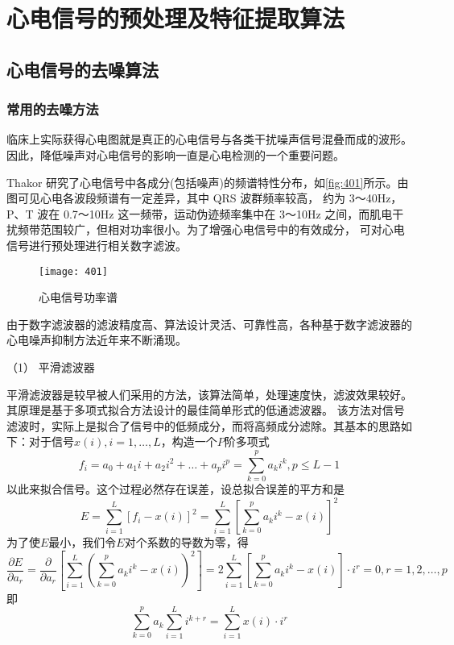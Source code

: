 \chapter{心电信号的预处理及特征提取算法}
\section{心电信号的去噪算法}
\subsection{常用的去噪方法}
临床上实际获得心电图就是真正的心电信号与各类干扰噪声信号混叠而成的波形。因此，降低噪声对心电信号的影响一直是心电检测的一个重要问题\cite{11}。 

Thakor 研究了心电信号中各成分(包括噪声)的频谱特性分布\cite{12}，如\autoref{fig:401}所示。由图可见心电各波段频谱有一定差异，其中 QRS 波群频率较高，
约为 3～40Hz，P、T 波在 0.7～10Hz 这一频带，运动伪迹频率集中在 3～10Hz 之间，而肌电干扰频带范围较广，但相对功率很小。为了增强心电信号中的有效成分，
可对心电信号进行预处理进行相关数字滤波\cite{13}。  
\begin{figure}[htbp]
    \centering
    \texttt{[image: 401]}
    \caption{\label{fig:401}心电信号功率谱}
\end{figure}

由于数字滤波器的滤波精度高、算法设计灵活、可靠性高，各种基于数字滤波器的心电噪声抑制方法近年来不断涌现。 

（1） 平滑滤波器 

平滑滤波器是较早被人们采用的方法，该算法简单，处理速度快，滤波效果较好\cite{14}。其原理是基于多项式拟合方法设计的最佳简单形式的低通滤波器\cite{15}。
该方法对信号滤波时，实际上是拟合了信号中的低频成分，而将高频成分滤除。其基本的思路如下：对于信号$x(i),i=1,\dots,L$，构造一个$P$阶多项式
\begin{equation}
    \label{equ:401}
    f_i=a_0+a_1i+a_2i^{2}+\dots+a_pi^{p}=\sum_{k=0}^{p}a_ki^k,  p\le L-1
\end{equation}
以此来拟合信号。这个过程必然存在误差，设总拟合误差的平方和是 
\begin{equation}
    \label{equ:402}
    E=\sum_{i=1}^L[f_i-x(i)]^2=\sum_{i=1}^L[\sum_{k=0}^pa_ki^k-x(i)]^2
\end{equation}
为了使$E$最小，我们令$E$对个系数的导数为零，得
\begin{equation}
    \label{equ:403}
    \frac{\partial E}{\partial a_r}=\frac{\partial}{\partial a_r}[\sum_{i=1}^L(\sum_{k=0}^pa_ki^k-x(i))^2]=2\sum_{i=1}^L[\sum_{k=0}^pa_ki^k-x(i)]\cdot i^r = 0, r=1,2,\dots, p
\end{equation}
即
\begin{equation}
    \label{equ:404}
    \sum_{k=0}^pa_k\sum_{i=1}^Li^{k+r}=\sum_{i=1}^Lx(i)\cdot i^r
\end{equation}

